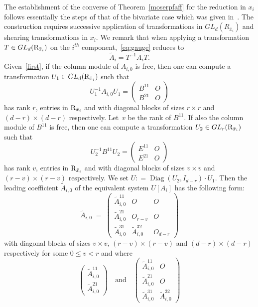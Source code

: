 \documentclass[final,1p,times,number,amsthm]{elsart}
\begin{document}
The establishment of the converse of Theorem~\ref{moserpfaff} for the reduction in $x_i$ follows
essentially the steps of that of the bivariate case which was given
in~\cite{key101}. The construction requires successive application of
transformations in $GL_d(R_{\bar{x}_i})$ and shearing transformations in
$x_i$. We remark that when applying a transformation
$T \in GL_d({\rm R}_{\bar{x}_{i}})$ on the $i^{th}$ component,~\eqref{eq:gauge}
reduces to
$$ \tilde{A}_{i}= T^{-1}  A_{i} T .$$
Given~\eqref{first}, if the column module of ${A}_{i,0}$ is free, then one can
compute a transformation $U_1 \in GL_d({\rm R}_{\bar{x}_{i}})$ such that
  $$U_1^{-1}{A}_{i,0} U_1  =  \left(\begin{matrix} B^{11} & O
      \\ B^{21} & O \end{matrix}\right)$$
  has rank $r$, entries in ${\rm R}_{\bar{x}_i}$ and with diagonal blocks of
  sizes $r\times r$ and $(d-r)\times(d-r)$ respectively. Let~$v$ be the rank of
  $B^{11}$.  If also the column module of $B^{11}$ is free, then one
  can compute a transformation $U_2 \in GL_r({\rm R}_{\bar{x}_i})$
  such that
  $$U_2^{-1}B^{11} U_2  =  \left(\begin{matrix} E^{11} & O  \\
       E^{21} & O \end{matrix}\right)$$
  has rank $v$, entries in ${\rm R}_{\bar{x}_i}$ and with diagonal blocks of
  sizes $v\times v$ and $(r-v)\times(r-v)$ respectively. We set
  $U : = \operatorname{Diag} (U_2,I_{d-r})\cdot U_1$.  Then the leading
  coefficient $\tilde{A}_{i,0}$ of the equivalent system $U[A_{i}]$ has the
  following form:
\begin{equation} \label{gaussformPfaffian} 
\tilde{A}_{i,0}
  \;=\; \left(\begin{matrix}\tilde{A}_{i,0}^{11} & O& O\\[5pt]
      \tilde{A}_{i,0}^{21} & O_{r-v}  & O \\[5pt] \tilde{A}_{i,0}^{31} &
      \tilde{A}_{i,0}^{32} & O_{d-r} \end{matrix}\right)\end{equation}
with diagonal blocks of sizes $v\times v$, $(r-v)\times(r-v)$  and
$(d-r)\times(d-r)$ respectively for some $0\leq v < r$ and where 
\[
  \left(\begin{matrix} \tilde{A}_{i,0}^{11} \\[5pt]
      \tilde{A}_{i,0}^{21} \end{matrix}\right) \quad \text{and} \quad
  \left(\begin{matrix}\tilde{A}_{i,0}^{11} & O \\[5pt] \tilde{A}_{i,0}^{21} & O
      \\[5pt] \tilde{A}_{i,0}^{31} & \tilde{A}_{i,0}^{32} \end{matrix}\right)\]
\end{document}
